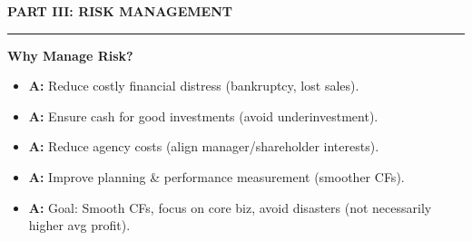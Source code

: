 \documentclass[7pt,landscape]{extarticle} %
\newcommand{\cheatsheetsection}[1]{%
  \vspace{0.25ex plus 0.1ex minus 0.05ex}%
  \noindent\color{SecTitleColor}\textbf{\sffamily\small\MakeUppercase{#1}}%
  \par\vspace{0.02ex}%
  {\color{RuleColor}\hrule height 0.3pt}\par\vspace{0.15ex}%
}
\newcommand{\cheatsheetsubsubsection}[1]{%
  \vspace{0.15ex plus 0.05ex minus 0.05ex}%
  \noindent\textbf{\sffamily\scriptsize #1}%
  \par\vspace{0.05ex}%
}
\newcommand{\A}[1]{\textbf{\textcolor{AppColor}{A:}} #1}
\begin{document}
\begin{multicols*}{4}
  \cheatsheetsection{Part III: Risk Management}
  
  \cheatsheetsubsubsection{Why Manage Risk?}
  \begin{itemize}
    \item \A{Reduce costly financial distress (bankruptcy, lost sales).}
    \item \A{Ensure cash for good investments (avoid underinvestment).}
    \item \A{Reduce agency costs (align manager/shareholder interests).}
    \item \A{Improve planning \& performance measurement (smoother CFs).}
    \item \A{Goal: Smooth CFs, focus on core biz, avoid disasters (not necessarily higher avg profit).}
  \end{itemize}
  

\end{multicols*}
\end{document}
